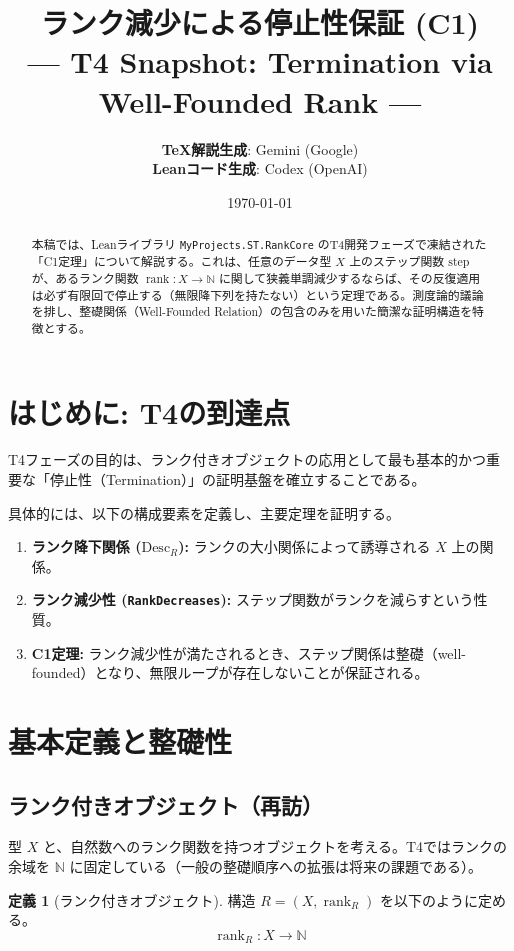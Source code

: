\documentclass[a4paper,11pt]{article}
\title{\textbf{ランク減少による停止性保証 (C1)}\\ \large --- T4 Snapshot: Termination via Well-Founded Rank ---}
\author{
    \textbf{TeX解説生成}: Gemini (Google) \\
    \textbf{Leanコード生成}: Codex (OpenAI)
}
\date{\today}
\theoremstyle{definition}
\newtheorem{definition}{定義}[section]
\theoremstyle{plain}
\newcommand{\code}[1]{\texttt{#1}}
\newcommand{\rank}{\operatorname{rank}}
\newcommand{\Desc}{\mathrm{Desc}}
\newcommand{\step}{\mathrm{step}}
\newcommand{\N}{\mathbb{N}}
\begin{document}
\maketitle

\begin{abstract}
本稿では、Leanライブラリ \code{MyProjects.ST.RankCore} のT4開発フェーズで凍結された「C1定理」について解説する。これは、任意のデータ型 $X$ 上のステップ関数 $\step$ が、あるランク関数 $\rank: X \to \N$ に関して狭義単調減少するならば、その反復適用は必ず有限回で停止する（無限降下列を持たない）という定理である。測度論的議論を排し、整礎関係（Well-Founded Relation）の包含のみを用いた簡潔な証明構造を特徴とする。
\end{abstract}

\tableofcontents

\section{はじめに: T4の到達点}
T4フェーズの目的は、ランク付きオブジェクトの応用として最も基本的かつ重要な「停止性（Termination）」の証明基盤を確立することである。

具体的には、以下の構成要素を定義し、主要定理を証明する。
\begin{enumerate}
    \item \textbf{ランク降下関係 ($\Desc_R$):} ランクの大小関係によって誘導される $X$ 上の関係。
    \item \textbf{ランク減少性 (\code{RankDecreases}):} ステップ関数がランクを減らすという性質。
    \item \textbf{C1定理:} ランク減少性が満たされるとき、ステップ関係は整礎（well-founded）となり、無限ループが存在しないことが保証される。
\end{enumerate}

\section{基本定義と整礎性}

\subsection{ランク付きオブジェクト（再訪）}
型 $X$ と、自然数へのランク関数を持つオブジェクトを考える。T4ではランクの余域を $\N$ に固定している（一般の整礎順序への拡張は将来の課題である）。

\begin{definition}[ランク付きオブジェクト]
構造 $R = (X, \rank_R)$ を以下のように定める。
\[ \rank_R : X \to \N \]
\end{definition}
\end{document}
